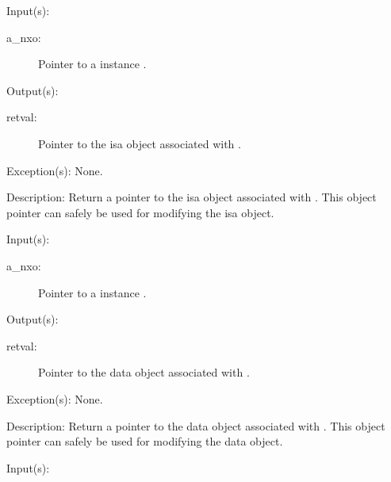 \begin{capi}
	\begin{capilist}
	\item[Input(s): ]
		\begin{description}\item[]
		\item[a\_nxo: ]
			Pointer to a instance .
		\end{description}
	\item[Output(s): ]
		\begin{description}\item[]
		\item[retval: ]
			Pointer to the isa object associated with .
		\end{description}
	\item[Exception(s): ] None.
	\item[Description: ]
		Return a pointer to the isa object associated with
		.  This object pointer can safely be used for
		modifying the isa object.
	\end{capilist}
\label{nxo_instance_data_get}
	\begin{capilist}
	\item[Input(s): ]
		\begin{description}\item[]
		\item[a\_nxo: ]
			Pointer to a instance \classname{nxo}.
		\end{description}
	\item[Output(s): ]
		\begin{description}\item[]
		\item[retval: ]
			Pointer to the data object associated with
			\cvar{a\_nxo}.
		\end{description}
	\item[Exception(s): ] None.
	\item[Description: ]
		Return a pointer to the data object associated with
		.  This object pointer can safely be used for
		modifying the data object.
	\end{capilist}
\label{nxo_instance_opaque_get}
	\begin{capilist}
	\item[Input(s): ]

\end{capilist}
\end{capi}
